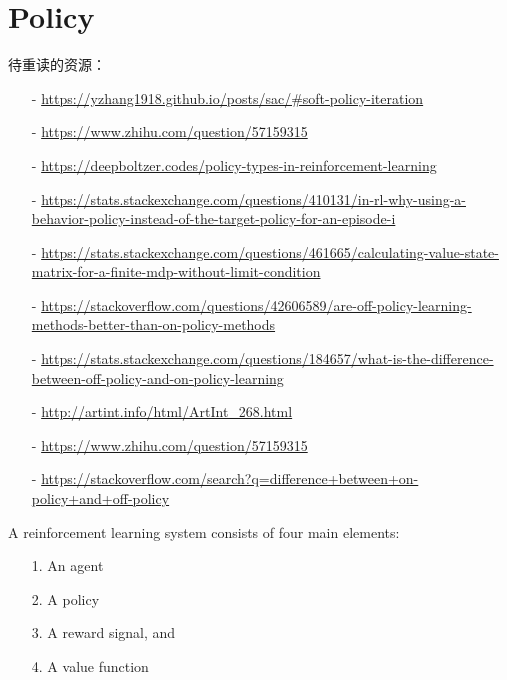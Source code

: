 

\chapter{Policy}

待重读的资源：
\begin{itemize}
\setlength{\parskip}{0pt}
\item[-]
\url{https://yzhang1918.github.io/posts/sac/#soft-policy-iteration}

\item[-]
\url{https://www.zhihu.com/question/57159315}

\item[-]
\url{https://deepboltzer.codes/policy-types-in-reinforcement-learning}

\item[-]
\url{https://stats.stackexchange.com/questions/410131/in-rl-why-using-a-behavior-policy-instead-of-the-target-policy-for-an-episode-i}

\item[-]
\url{https://stats.stackexchange.com/questions/461665/calculating-value-state-matrix-for-a-finite-mdp-without-limit-condition}

\item[-]
\url{https://stackoverflow.com/questions/42606589/are-off-policy-learning-methods-better-than-on-policy-methods}

\item[-]
\url{https://stats.stackexchange.com/questions/184657/what-is-the-difference-between-off-policy-and-on-policy-learning}

\item[-]
\url{http://artint.info/html/ArtInt_268.html}

\item[-]
\url{https://www.zhihu.com/question/57159315}

\item[-]
\url{https://stackoverflow.com/search?q=difference+between+on-policy+and+off-policy}
\end{itemize}

A reinforcement learning system consists of four main elements:
\begin{itemize}
\setlength{\parskip}{0pt}
\item[1.]
An agent
\item[2.]
A policy 
\item[3.]
A reward signal, and 
\item[4.]
A value function
\end{itemize}

